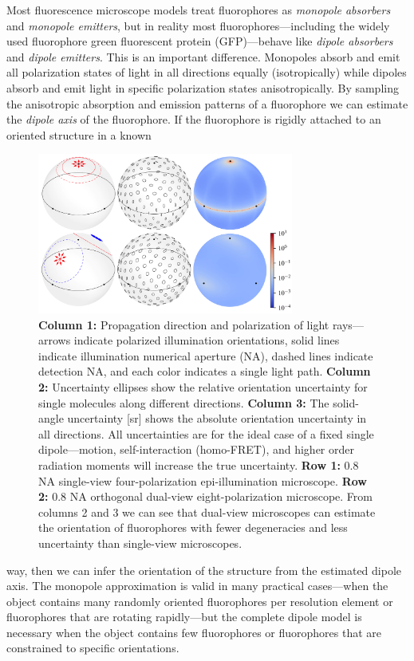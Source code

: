 \documentclass[11pt]{article}
\begin{document}
{Most fluorescence microscope models treat fluorophores as \textit{monopole
    absorbers} and \textit{monopole emitters}, but in reality most
  fluorophores---including the widely used fluorophore green fluorescent protein
  (GFP)---behave like \textit{dipole absorbers} and \textit{dipole
    emitters}. This is an important difference. Monopoles absorb and emit all
  polarization states of light in all directions equally (isotropically) while
  dipoles absorb and emit light in specific polarization states
  anisotropically. By sampling the anisotropic absorption and emission patterns
  of a fluorophore we can estimate the \textit{dipole axis} of the
  fluorophore. If the fluorophore is rigidly attached to an oriented structure
  in a known \parfillskip=0pt\par}
\begin{figure}[H]
\centering
  \includegraphics[width=0.75\textwidth, interpolate=true, trim={0em 0em 0em 0em}]{figs/proposal-fig}
  \caption{\textbf{Column 1:} Propagation direction and polarization of light
    rays---arrows indicate polarized illumination orientations, solid lines
    indicate illumination numerical aperture (NA), dashed lines indicate
    detection NA, and each color indicates a single light path. \textbf{Column
      2:} Uncertainty ellipses show the relative orientation uncertainty for
    single molecules along different directions. \textbf{Column 3:} The
    solid-angle uncertainty [sr] shows the absolute orientation uncertainty in
    all directions. All uncertainties are for the ideal case of a fixed single
    dipole---motion, self-interaction (homo-FRET), and higher order radiation
    moments will increase the true uncertainty. \textbf{Row 1:} 0.8 NA
    single-view four-polarization epi-illumination microscope. \textbf{Row 2:}
    0.8 NA orthogonal dual-view eight-polarization microscope. From columns 2
    and 3 we can see that dual-view microscopes can estimate the orientation of
    fluorophores with fewer degeneracies and less uncertainty than single-view
    microscopes.}
  \label{fig:comparison}
\end{figure}
\noindent way, then we can infer the orientation of the structure from the estimated
dipole axis. The monopole approximation is valid in many practical cases---when
the object contains many randomly oriented fluorophores per resolution element
or fluorophores that are rotating rapidly---but the complete dipole model is
necessary when the object contains few fluorophores or fluorophores that are
constrained to specific orientations.
\end{document}
